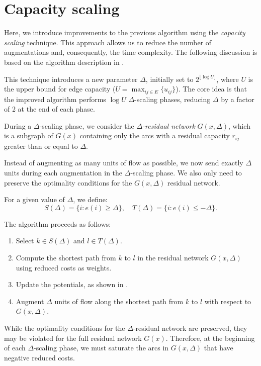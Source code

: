 
\section{Capacity scaling}

Here, we introduce improvements to the previous algorithm using the \textit{capacity scaling} technique. This approach allows us to reduce the number of augmentations and, consequently, the time complexity. The following discussion is based on the algorithm description in \cite{ahuja1993network}.

This technique introduces a new parameter $\Delta$, initially set to $2^{\lfloor\log U \rfloor}$, where $U$ is the upper bound for edge capacity ($U = \max_{ij \in E} \{u_{ij}\}$). The core idea is that the improved algorithm performs $\log U$ $\Delta$-scaling phases, reducing $\Delta$ by a factor of 2 at the end of each phase.

During a $\Delta$-scaling phase, we consider the \textit{$\Delta$-residual network} $G(x, \Delta)$, which is a subgraph of $G(x)$ containing only the arcs with a residual capacity $r_{ij}$ greater than or equal to $\Delta$.

Instead of augmenting as many units of flow as possible, we now send exactly $\Delta$ units during each augmentation in the $\Delta$-scaling phase. We also only need to preserve the optimality conditions for the $G(x, \Delta)$ residual network.

For a given value of $\Delta$, we define: 
$$
S(\Delta) = \{i \colon e(i) \geq \Delta\},\quad
T(\Delta) = \{i \colon e(i) \leq -\Delta\}.
$$

The algorithm proceeds as follows:
\begin{enumerate}
    \item Select $k \in S(\Delta)$ and $l \in T(\Delta)$.
    \item Compute the shortest path from $k$ to $l$ in the residual network $G(x, \Delta)$ using reduced costs as weights.
    \item Update the potentials, as shown in .
    \item Augment $\Delta$ units of flow along the shortest path from $k$ to $l$ with respect to $G(x,\Delta)$.
\end{enumerate}

While the optimality conditions for the $\Delta$-residual network are preserved, they may be violated for the full residual network $G(x)$. Therefore, at the beginning of each $\Delta$-scaling phase, we must saturate the arcs in $G(x, \Delta)$ that have negative reduced costs. 

